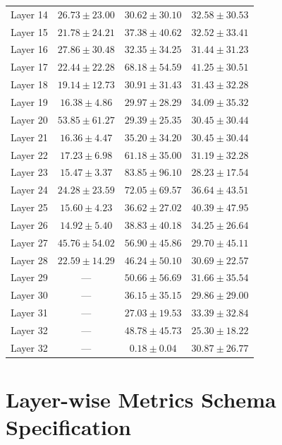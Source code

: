 \documentclass[10pt,conference]{IEEEtran}
\begin{document}
\begin{table}[htbp]
\begin{tabular}{cccc}
Layer 14 & $26.73 \pm 23.00$ & $30.62 \pm 30.10$ & $32.58 \pm 30.53$ \\
Layer 15 & $21.78 \pm 24.21$ & $37.38 \pm 40.62$ & $32.52 \pm 33.41$ \\
Layer 16 & $27.86 \pm 30.48$ & $32.35 \pm 34.25$ & $31.44 \pm 31.23$ \\
Layer 17 & $22.44 \pm 22.28$ & $68.18 \pm 54.59$ & $41.25 \pm 30.51$ \\
Layer 18 & $19.14 \pm 12.73$ & $30.91 \pm 31.43$ & $31.43 \pm 32.28$ \\
Layer 19 & $16.38 \pm 4.86$ & $29.97 \pm 28.29$ & $34.09 \pm 35.32$ \\
Layer 20 & $53.85 \pm 61.27$ & $29.39 \pm 25.35$ & $30.45 \pm 30.44$ \\
Layer 21 & $16.36 \pm 4.47$ & $35.20 \pm 34.20$ & $30.45 \pm 30.44$ \\
Layer 22 & $17.23 \pm 6.98$ & $61.18 \pm 35.00$ & $31.19 \pm 32.28$ \\
Layer 23 & $15.47 \pm 3.37$ & $83.85 \pm 96.10$ & $28.23 \pm 17.54$ \\
Layer 24 & $24.28 \pm 23.59$ & $72.05 \pm 69.57$ & $36.64 \pm 43.51$ \\
Layer 25 & $15.60 \pm 4.23$ & $36.62 \pm 27.02$ & $40.39 \pm 47.95$ \\
Layer 26 & $14.92 \pm 5.40$ & $38.83 \pm 40.18$ & $34.25 \pm 26.64$ \\
Layer 27 & $45.76 \pm 54.02$ & $56.90 \pm 45.86$ & $29.70 \pm 45.11$ \\
Layer 28 & $22.59 \pm 14.29$ & $46.24 \pm 50.10$ & $30.69 \pm 22.57$ \\
Layer 29 & \multicolumn{1}{c}{---} & $50.66 \pm 56.69$ & $31.66 \pm 35.54$ \\
Layer 30 & \multicolumn{1}{c}{---} & $36.15 \pm 35.15$ & $29.86 \pm 29.00$ \\
Layer 31 & \multicolumn{1}{c}{---} & $27.03 \pm 19.53$ & $33.39 \pm 32.84$ \\
Layer 32 & \multicolumn{1}{c}{---} & $48.78 \pm 45.73$ & $25.30 \pm 18.22$ \\
Layer 32 & \multicolumn{1}{c}{---} & $0.18 \pm 0.04$ & $30.87 \pm 26.77$ \\
\bottomrule
\end{tabular}
\end{table}

\section{Layer-wise Metrics Schema Specification}
\label{appendix:schema_telemetry}
\end{document}
